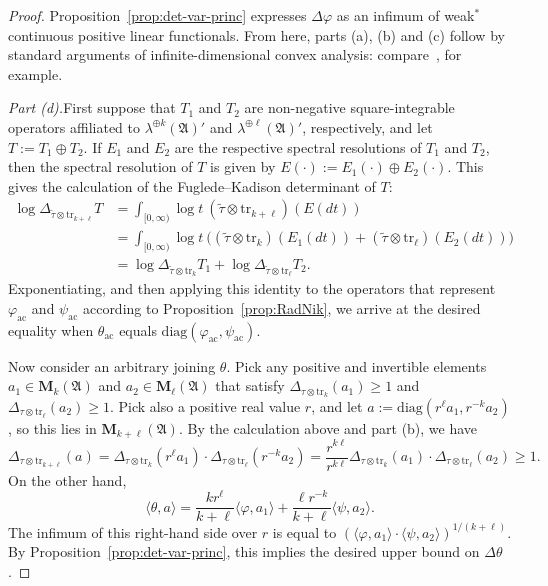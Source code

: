 \documentclass[12pt,a4paper]{article}
\numberwithin{equation}{section}
\theoremstyle{remark}
\renewcommand{\rm}[1]{\mathrm{#1}}
\newcommand{\rmM}{\mathbf{M}}
\newcommand{\A}{\mathfrak{A}}
\renewcommand{\phi}{\varphi}
\renewcommand{\l}{\lambda}
\renewcommand{\t}[1]{\widetilde{#1}}
\newcommand{\Tr}{\mathrm{tr}}
\begin{document}
\begin{proof}
Proposition~\ref{prop:det-var-princ} expresses $\Delta \phi$ as an infimum of weak$^\ast$ continuous positive linear functionals.  From here, parts (a), (b) and (c) follow by standard arguments of infinite-dimensional convex analysis: compare~\cite[Thm. I.6.3]{SimSMLG}, for example.

\vspace{7pt}

\emph{Part (d).}\quad First suppose that $T_1$ and $T_2$ are non-negative square-integrable operators affiliated to $\l^{\oplus k}(\A)'$ and $\l^{\oplus \ell}(\A)'$, respectively, and let $T := T_1 \oplus T_2$.  If $E_1$ and $E_2$ are the respective spectral resolutions of $T_1$ and $T_2$, then the spectral resolution of $T$ is given by $E(\cdot) := E_1(\cdot) \oplus E_2(\cdot)$. This gives the calculation of the Fuglede--Kadison determinant of $T$:
\begin{align*}
\log\Delta_{\t{\tau}\otimes \Tr_{k+\ell}}T &= \int_{[0,\infty)}\log t\ (\t{\tau}\otimes \Tr_{k+\ell})(E(dt))\\
&= \int_{[0,\infty)}\log t\ \big((\t{\tau}\otimes \Tr_k)(E_1(dt)) + (\t{\tau}\otimes \Tr_\ell)(E_2(dt))\big)\\
&= \log\Delta_{\t{\tau}\otimes \Tr_k}T_1 + \log\Delta_{\t{\tau}\otimes \Tr_\ell}T_2.
\end{align*}
Exponentiating, and then applying this identity to the operators that represent $\phi_{\rm{ac}}$ and $\psi_{\rm{ac}}$ according to Proposition~\ref{prop:RadNik}, we arrive at the desired equality when $\theta_{\rm{ac}}$ equals $\rm{diag}(\phi_{\rm{ac}},\psi_{\rm{ac}})$.

Now consider an arbitrary joining $\theta$.  Pick any positive and invertible elements $a_1 \in \rmM_k(\A)$ and $a_2 \in \rmM_\ell(\A)$ that satisfy $\Delta_{\tau\otimes \Tr_k}(a_1) \ge 1$ and $\Delta_{\tau\otimes \Tr_\ell}(a_2) \ge 1$.  Pick also a positive real value $r$, and let $a := \rm{diag}(r^\ell a_1,r^{-k}a_2)$, so this lies in $\rmM_{k+\ell}(\A)$.   By the calculation above and part (b), we have
\[\Delta_{\tau\otimes \Tr_{k+\ell}}(a) = \Delta_{\tau\otimes \Tr_k}(r^\ell a_1)\cdot \Delta_{\tau\otimes \Tr_\ell}(r^{-k}a_2) = \frac{r^{k\ell}}{r^{k\ell}}\Delta_{\tau\otimes \Tr_k}(a_1)\cdot \Delta_{\tau\otimes \Tr_\ell}(a_2) \ge 1.\]
On the other hand,
\[\langle \theta,a\rangle = \frac{kr^\ell}{k+\ell}\langle \phi,a_1\rangle + \frac{\ell r^{-k}}{k+\ell}\langle\psi,a_2\rangle.\]
The infimum of this right-hand side over $r$ is equal to $(\langle \phi,a_1\rangle\cdot \langle\psi,a_2\rangle)^{1/(k+\ell)}$.  By Proposition~\ref{prop:det-var-princ}, this implies the desired upper bound on $\Delta \theta$.


\end{proof}
\end{document}
